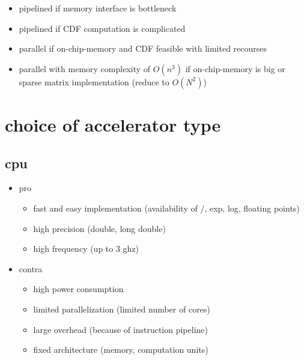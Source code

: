 \documentclass[mscthesis]{usiinfthesis}
\begin{document}
\begin{itemize}
    \item pipelined if memory interface is bottleneck
    \item pipelined if CDF computation is complicated
    \item parallel if on-chip-memory and CDF feasible with limited recourses
    \item parallel with memory complexity of $O(n^3)$ if on-chip-memory is big
        or sparse matrix implementation (reduce to $O(N^2)$)
\end{itemize}

\section{choice of accelerator type}
\label{ch:analysis_choice}

\subsection{cpu}
\begin{itemize}
    \item pro
    \begin{itemize}
        \item fast and easy implementation (availability of /, exp, log,
            floating points)
        \item high precision (double, long double)
        \item high frequency (up to 3 ghz)
    \end{itemize}
    \item contra
    \begin{itemize}
        \item high power consumption
        \item limited parallelization (limited number of cores)
        \item large overhead (because of instruction pipeline)
        \item fixed architecture (memory, computation units)
    \end{itemize}
\end{itemize}

\end{document}
